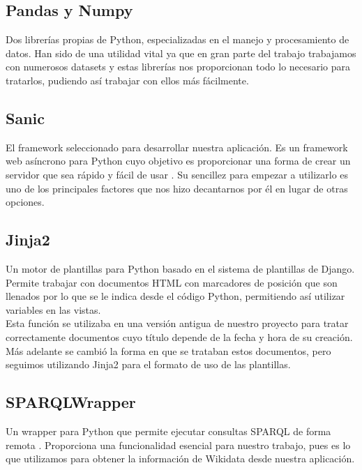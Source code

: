 \subsection*{Pandas y Numpy}

Dos librerías propias de Python, especializadas en el manejo y procesamiento de datos. Han sido de una utilidad vital ya que en gran parte del trabajo trabajamos con numerosos datasets y estas librerías nos proporcionan todo lo necesario para tratarlos, pudiendo así trabajar con ellos más fácilmente.

\subsection*{Sanic}

El framework seleccionado para desarrollar nuestra aplicación. Es un framework web asíncrono para Python cuyo objetivo es proporcionar una forma de crear un servidor que sea rápido y fácil de usar \cite{sanic}. Su sencillez para empezar a utilizarlo es uno de los principales factores que nos hizo decantarnos por él en lugar de otras opciones.

\subsection*{Jinja2}

Un motor de plantillas para Python basado en el sistema de plantillas de Django. Permite trabajar con documentos HTML con marcadores de posición que son llenados por lo que se le indica desde el código Python, permitiendo así utilizar variables en las vistas.\\

Esta función se utilizaba en una versión antigua de nuestro proyecto para tratar correctamente documentos cuyo título depende de la fecha y hora de su creación. Más adelante se cambió la forma en que se trataban estos documentos, pero seguimos utilizando Jinja2 para el formato de uso de las plantillas.

\subsection*{SPARQLWrapper}

Un wrapper para Python que permite ejecutar consultas SPARQL de forma remota \cite{sparqlwrapper}. Proporciona una funcionalidad esencial para nuestro trabajo, pues es lo que utilizamos para obtener la información de Wikidata desde nuestra aplicación.

